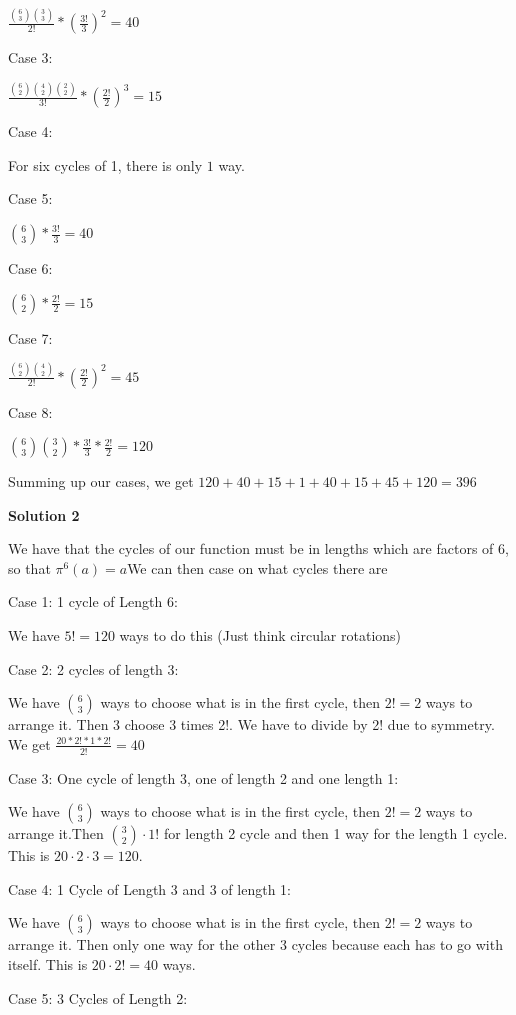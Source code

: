 \begin{enumerate}
 $\frac{\binom{6}{3}\binom{3}{3}}{2!}*(\frac{3!}{3})^2=40$

 Case 3:

 $\frac{\binom{6}{2}\binom{4}{2}\binom{2}{2}}{3!}*(\frac{2!}{2})^3=15$

 Case 4:

 For six cycles of 1, there is only $1$ way.

 Case 5:

 $\binom{6}{3}*\frac{3!}{3}=40$

 Case 6:

 $\binom{6}{2}*\frac{2!}{2}=15$

 Case 7:

 $\frac{\binom{6}{2}\binom{4}{2}}{2!}*(\frac{2!}{2})^2=45$

 Case 8:

 $\binom{6}{3}\binom{3}{2}*\frac{3!}{3}*\frac{2!}{2}=120$

 Summing up our cases, we get $120+40+15+1+40+15+45+120=\boxed{396}$




\textbf{Solution 2}

We have that the cycles of our function must be in lengths which are factors of 6, so that $\pi^6(a) = a$We can then case on what cycles there are

 Case 1: 1 cycle of Length 6:

 We have $5!=120$ ways to do this (Just think circular rotations)

 Case 2: 2 cycles of length 3:

 We have $\binom63$ ways to choose what is in the first cycle, then $2! = 2$ ways to arrange it. Then 3 choose 3 times 2!. We have to divide by 2! due to symmetry. We get $\frac{20 * 2! * 1 * 2!}{2!} = 40$

 Case 3: One cycle of length 3, one of length 2 and one length 1:

 We have $\binom63$ ways to choose what is in the first cycle, then $2! = 2$ ways to arrange it.Then $\binom32\cdot1!$ for length 2 cycle and then 1 way for the length 1 cycle. This is $20 \cdot 2 \cdot 3 = 120$.

 Case 4: 1 Cycle of Length 3 and 3 of length 1:

 We have $\binom63$ ways to choose what is in the first cycle, then $2! = 2$ ways to arrange it. Then only one way for the other 3 cycles because each has to go with itself. This is $20 \cdot 2! = 40$ ways.

 Case 5: 3 Cycles of Length 2:


\end{enumerate}
